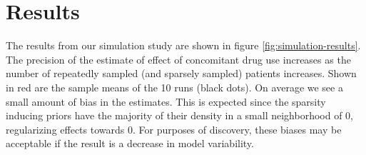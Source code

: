 \section{Results}

The results from our simulation study are shown in figure \ref{fig:simulation-results}. The precision of the estimate of effect of concomitant drug use increases as the number of repeatedly sampled (and sparsely sampled) patients increases.  Shown in red are the sample means of the 10 runs (black dots).  On average we see a small amount of bias in the estimates.  This is expected since the sparsity inducing priors have the majority of their density in a small neighborhood of 0, regularizing effects towards 0.  For purposes of discovery, these biases may be acceptable if the result is a decrease in model variability.



